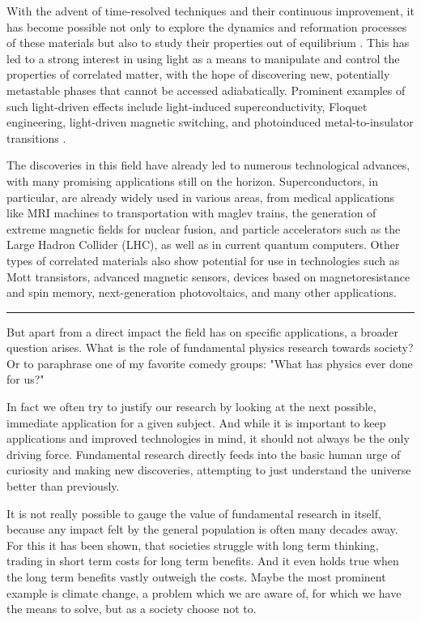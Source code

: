 With the advent of time-resolved techniques and their continuous improvement, it has become possible not only to explore the dynamics and reformation processes of these materials but also to study their properties out of equilibrium \cite{giannetti_ultrafast_2016}.
This has led to a strong interest in using light as a means to manipulate and control the properties of correlated matter, with the hope of discovering new, potentially metastable phases that cannot be accessed adiabatically.
Prominent examples of such light-driven effects include light-induced superconductivity, Floquet engineering, light-driven magnetic switching, and photoinduced metal-to-insulator transitions \cite{fausti_light-induced_2011,takubo_photoinduced_2008}.

The discoveries in this field have already led to numerous technological advances, with many promising applications still on the horizon.
Superconductors, in particular, are already widely used in various areas, from medical applications like MRI machines to transportation with maglev trains, the generation of extreme magnetic fields for nuclear fusion, and particle accelerators such as the Large Hadron Collider (LHC), as well as in current quantum computers.
Other types of correlated materials also show potential for use in technologies such as Mott transistors, advanced magnetic sensors, devices based on magnetoresistance and spin memory, next-generation photovoltaics, and many other applications.

\begin{center}
	\rule{0.3\textwidth}{.8pt}
\end{center}

But apart from a direct impact the field has on specific applications, a broader question arises.
What is the role of fundamental physics research towards society?
Or to paraphrase one of my favorite comedy groups: "What has physics ever done for us?"

In fact we often try to justify our research by looking at the next possible, immediate application for a given subject.
And while it is important to keep applications and improved technologies in mind, it should not always be the only driving force.
Fundamental research directly feeds into the basic human urge of curiosity and making new discoveries, attempting to just understand the universe better than previously.

It is not really possible to gauge the value of fundamental research in itself, because any impact felt by the general population is often many decades away.
For this it has been shown, that societies struggle with long term thinking, trading in short term costs for long term benefits.
And it even holds true when the long term benefits vastly outweigh the costs.
Maybe the most prominent example is climate change, a problem which we are aware of, for which we have the means to solve, but as a society choose not to.

